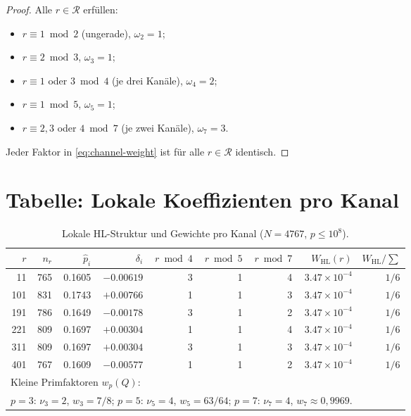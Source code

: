 \documentclass[11pt,a4paper]{article}
\newcommand{\R}{\mathcal{R}}
\newcommand{\HL}{\mathrm{HL}}
\begin{document}
\begin{proof}
Alle $r\in\R$ erfüllen:
\begin{itemize}
  \item $r\equiv 1\bmod 2$ (ungerade), $\omega_2=1$;
  \item $r\equiv 2\bmod 3$, $\omega_3=1$;
  \item $r\equiv 1$ oder $3\bmod 4$ (je drei Kanäle), $\omega_4=2$;
  \item $r\equiv 1\bmod 5$, $\omega_5=1$;
  \item $r\equiv 2,3$ oder $4\bmod 7$ (je zwei Kanäle), $\omega_7=3$.
\end{itemize}
Jeder Faktor in \eqref{eq:channel-weight} ist für alle $r\in\R$ identisch.
\end{proof}

\section{Tabelle: Lokale Koeffizienten pro Kanal}

\begin{table}[h]
\centering
\caption{Lokale HL-Struktur und Gewichte pro Kanal ($N=4767$, $p\le 10^8$).}
\label{tab:coefficients}
\begin{tabular}{@{}rrrrrrrrr@{}}
\toprule
$r$ & $n_r$ & $\hat p_i$ & $\delta_i$ &
$r\bmod 4$ & $r\bmod 5$ & $r\bmod 7$ &
$W_{\HL}(r)$ & $W_{\HL}/\sum$ \\
\midrule
 11 & 765 & 0.1605 & $-0.00619$ & 3 & 1 & 4 & $3.47\times 10^{-4}$ & $1/6$ \\
101 & 831 & 0.1743 & $+0.00766$ & 1 & 1 & 3 & $3.47\times 10^{-4}$ & $1/6$ \\
191 & 786 & 0.1649 & $-0.00178$ & 3 & 1 & 2 & $3.47\times 10^{-4}$ & $1/6$ \\
221 & 809 & 0.1697 & $+0.00304$ & 1 & 1 & 4 & $3.47\times 10^{-4}$ & $1/6$ \\
311 & 809 & 0.1697 & $+0.00304$ & 3 & 1 & 3 & $3.47\times 10^{-4}$ & $1/6$ \\
401 & 767 & 0.1609 & $-0.00577$ & 1 & 1 & 2 & $3.47\times 10^{-4}$ & $1/6$ \\
\midrule
\multicolumn{8}{l}{Kleine Primfaktoren $w_p(Q)$:} \\
\multicolumn{8}{l}{$p=3$: $\nu_3=2$, $w_3=7/8$;
$p=5$: $\nu_5=4$, $w_5=63/64$;
$p=7$: $\nu_7=4$, $w_7\approx 0{,}9969$.} \\
\bottomrule
\end{tabular}
\end{table}
\end{document}

